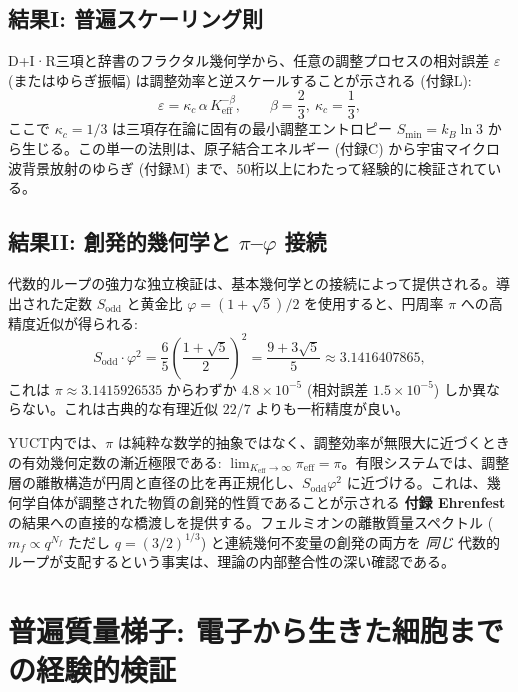 \documentclass[11pt,a4paper]{article}
\begin{document}
	\subsection{結果I: 普遍スケーリング則}
	\label{subsec:consequence-scaling}
	
	D+I·R三項と辞書のフラクタル幾何学から、任意の調整プロセスの相対誤差 $\varepsilon$ (またはゆらぎ振幅) は調整効率と逆スケールすることが示される (付録L):
	\[
	\boxed{\varepsilon = \kappa_c \, \alpha \, K_{\mathrm{eff}}^{-\beta}, \qquad \beta = \frac{2}{3},\ \kappa_c = \frac{1}{3}},
	\]
	ここで $\kappa_c = 1/3$ は三項存在論に固有の最小調整エントロピー $S_{\min} = k_B \ln 3$ から生じる。この単一の法則は、原子結合エネルギー (付録C) から宇宙マイクロ波背景放射のゆらぎ (付録M) まで、50桁以上にわたって経験的に検証されている。
	
	\subsection{結果II: 創発的幾何学と $\pi$–$\varphi$ 接続}
	\label{subsec:consequence-geometry}
	
	代数的ループの強力な独立検証は、基本幾何学との接続によって提供される。導出された定数 $S_{\mathrm{odd}}$ と黄金比 $\varphi = (1+\sqrt{5})/2$ を使用すると、円周率 $\pi$ への高精度近似が得られる:
	\[
	S_{\mathrm{odd}} \cdot \varphi^2 = \frac{6}{5} \left( \frac{1+\sqrt{5}}{2} \right)^2 = \frac{9+3\sqrt{5}}{5} \approx 3.1416407865,
	\]
	これは $\pi \approx 3.1415926535$ からわずか $4.8 \times 10^{-5}$ (相対誤差 $1.5 \times 10^{-5}$) しか異ならない。これは古典的な有理近似 $22/7$ よりも一桁精度が良い。
	
	YUCT内では、$\pi$ は純粋な数学的抽象ではなく、調整効率が無限大に近づくときの有効幾何定数の漸近極限である: $\lim_{K_{\mathrm{eff}} \to \infty} \pi_{\mathrm{eff}} = \pi$。有限システムでは、調整層の離散構造が円周と直径の比を再正規化し、$S_{\mathrm{odd}}\varphi^2$ に近づける。これは、幾何学自体が調整された物質の創発的性質であることが示される \textbf{付録 Ehrenfest} の結果への直接的な橋渡しを提供する。フェルミオンの離散質量スペクトル ($m_f \propto q^{N_f}$ ただし $q = (3/2)^{1/3}$) と連続幾何不変量の創発の両方を \emph{同じ} 代数的ループが支配するという事実は、理論の内部整合性の深い確認である。
	
	\section{普遍質量梯子: 電子から生きた細胞までの経験的検証}
	\label{sec:mass_ladder}
	
\end{document}
